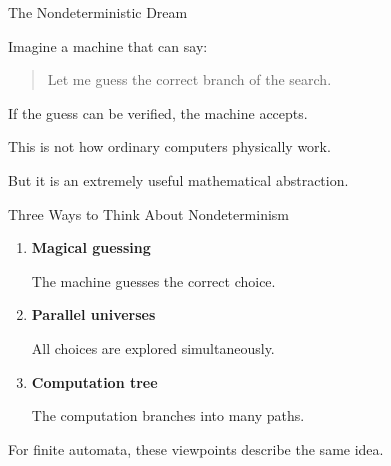 \documentclass[10pt,aspectratio=169]{beamer}
\begin{document}
\begin{frame}{The Nondeterministic Dream}

Imagine a machine that can say:

\begin{quote}
Let me guess the correct branch of the search.
\end{quote}

\vspace{1em}

If the guess can be verified, the machine accepts.

\pause

\vspace{1em}

This is not how ordinary computers physically work.

But it is an extremely useful mathematical abstraction.

\end{frame}

\begin{frame}{Three Ways to Think About Nondeterminism}

\begin{enumerate}
\item \textbf{Magical guessing}

The machine guesses the correct choice.

\vspace{0.4em}

\item \textbf{Parallel universes}

All choices are explored simultaneously.

\vspace{0.4em}

\item \textbf{Computation tree}

The computation branches into many paths.
\end{enumerate}

\vspace{1em}

\pause
For finite automata, these viewpoints describe the same idea.

\end{frame}
\end{document}
